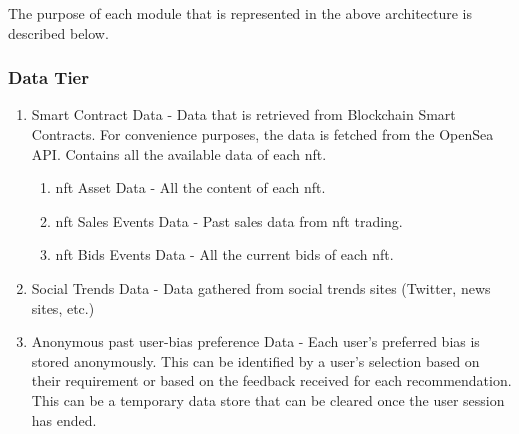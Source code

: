 \noindent The purpose of each module that is represented in the above architecture is described below.

\subsubsection{Data Tier}
\begin{enumerate}
    \item Smart Contract Data - Data that is retrieved from Blockchain Smart Contracts. For convenience purposes, the data is fetched from the OpenSea API. Contains all the available data of each \gls{nft}.
    \begin{enumerate}
        \item \gls{nft} Asset Data - All the content of each \gls{nft}.
        \item \gls{nft} Sales Events Data - Past sales data from \gls{nft} trading.
        \item \gls{nft} Bids Events Data - All the current bids of each \gls{nft}.  %
    \end{enumerate}
    \item Social Trends Data - Data gathered from social trends sites (Twitter, news sites, etc.)
    \item Anonymous past user-bias preference Data - Each user's preferred bias is stored anonymously. This can be identified by a user's selection based on their requirement or based on the feedback received for each recommendation. This can be a temporary data store that can be cleared once the user session has ended.
\end{enumerate}

